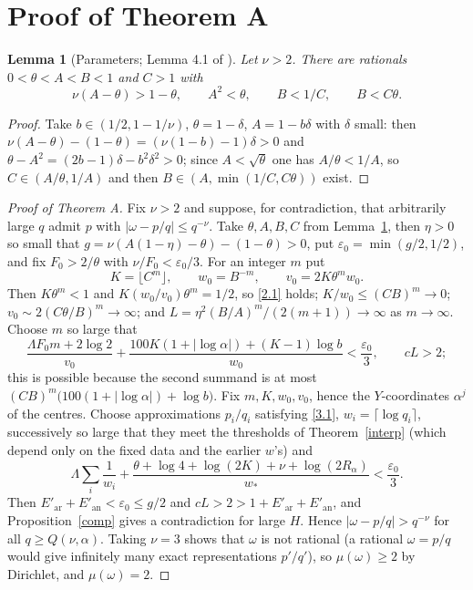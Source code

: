 \documentclass[11pt]{amsart}
\newtheorem{lemma}{Lemma}[section]
\newcommand{\eps}{\varepsilon}
\begin{document}
\section{Proof of Theorem A}\label{sec:proof}

\begin{lemma}[Parameters; Lemma 4.1 of \cite{OAI}]\label{params}
Let $\nu>2$. There are rationals $0<\theta<A<B<1$ and $C>1$ with
\[
\nu(A-\theta)>1-\theta,\qquad A^2<\theta,\qquad B<1/C,\qquad B<C\theta .
\]
\end{lemma}
\begin{proof}
Take $b\in(1/2,1-1/\nu)$, $\theta=1-\delta$, $A=1-b\delta$ with $\delta$ small: then $\nu(A-\theta)-(1-\theta)=(\nu(1-b)-1)\delta>0$ and $\theta-A^2=(2b-1)\delta-b^2\delta^2>0$; since $A<\sqrt\theta$ one has $A/\theta<1/A$, so $C\in(A/\theta,1/A)$ and then $B\in(A,\min(1/C,C\theta))$ exist.
\end{proof}

\begin{proof}[Proof of Theorem A]
Fix $\nu>2$ and suppose, for contradiction, that arbitrarily large $q$ admit $p$ with $|\omega-p/q|\le q^{-\nu}$. Take $\theta,A,B,C$ from Lemma~\ref{params}, then $\eta>0$ so small that $g=\nu(A(1-\eta)-\theta)-(1-\theta)>0$, put $\eps_0=\min(g/2,1/2)$, and fix $F_0>2/\theta$ with $\nu/F_0<\eps_0/3$. For an integer $m$ put
\[
K=\lfloor C^m\rfloor,\qquad w_0=B^{-m},\qquad v_0=2K\theta^mw_0 .
\]
Then $K\theta^m<1$ and $K(w_0/v_0)\theta^m=1/2$, so \eqref{2.1} holds; $K/w_0\le(CB)^m\to0$; $v_0\sim2(C\theta/B)^m\to\infty$; and $L=\eta^2(B/A)^m/(2(m+1))\to\infty$ as $m\to\infty$. Choose $m$ so large that
\begin{equation}\label{4.8}
\frac{\Lambda F_0m+2\log2}{v_0}+\frac{100K(1+|\log\alpha|)+(K-1)\log b}{w_0}<\frac{\eps_0}3,\qquad cL>2 ;
\end{equation}
this is possible because the second summand is at most $(CB)^m\bigl(100(1+|\log\alpha|)+\log b\bigr)$. Fix $m,K,w_0,v_0$, hence the $Y$-coordinates $\alpha^j$ of the centres. Choose approximations $p_i/q_i$ satisfying \eqref{3.1}, $w_i=\lceil\log q_i\rceil$, successively so large that they meet the thresholds of Theorem~\ref{interp} (which depend only on the fixed data and the earlier $w$'s) and
\begin{equation}\label{4.9}
\Lambda\sum_i\frac1{w_i}+\frac{\theta+\log4+\log(2K)+\nu+\log(2R_\alpha)}{w_*}<\frac{\eps_0}3 .
\end{equation}
Then $E'_{\mathrm{ar}}+E'_{\mathrm{an}}<\eps_0\le g/2$ and $cL>2>1+E'_{\mathrm{ar}}+E'_{\mathrm{an}}$, and Proposition~\ref{comp} gives a contradiction for large $H$. Hence $|\omega-p/q|>q^{-\nu}$ for all $q\ge Q(\nu,\alpha)$. Taking $\nu=3$ shows that $\omega$ is not rational (a rational $\omega=p/q$ would give infinitely many exact representations $p'/q'$), so $\mu(\omega)\ge2$ by Dirichlet, and $\mu(\omega)=2$.
\end{proof}
\end{document}
